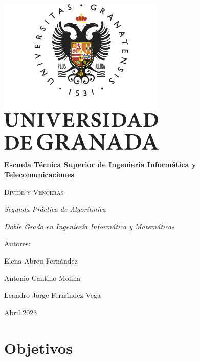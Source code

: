 \documentclass[a4paper,12pt,twoside]{article} %
\begin{document}
\begin{titlepage}
\centering

{\includegraphics[width=0.6\textwidth]{foto_portada.png}\par}
\vspace{1cm}

{\bfseries\LARGE Escuela Técnica Superior de Ingeniería Informática y Telecomunicaciones \par}
\vspace{0.4cm}

{\scshape\Huge Divide y Vencerás \par}
\vspace{0.4cm}

{\itshape\Large Segunda Práctica de Algorítmica \par}
\vspace{0.5cm}

{\itshape\Large Doble Grado en Ingeniería Informática y Matemáticas \par}
\vspace{0.4cm}

{\Large Autores: \par}
{\Large Elena Abreu Fernández \par}
{\Large Antonio Cantillo Molina \par}
{\Large Leandro Jorge Fernández Vega \par}
\vfill

{\Large Abril 2023 \par}

\end{titlepage}

\tableofcontents
\newpage


\section{Objetivos}
\end{document}
